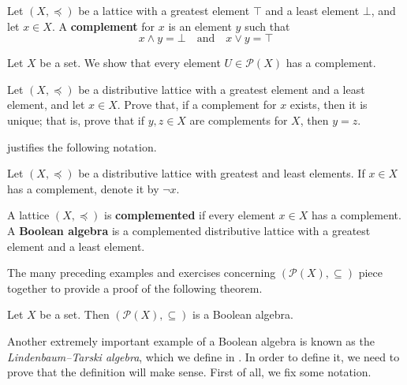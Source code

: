 \begin{definition}
\label{defComplement}
Let $(X, \preceq)$ be a lattice with a greatest element $\top$ and a least element $\bot$, and let $x \in X$. A \textbf{complement} for $x$ is an element $y$ such that
\[ x \wedge y = \bot \quad \text{and} \quad x \vee y = \top \]
\end{definition}

\begin{example}
Let $X$ be a set. We show that every element $U \in \mathcal{P}(X)$ has a complement.
\end{example}

\begin{exercise}
Let $(X, \preceq)$ be a distributive lattice with a greatest element and a least element, and let $x \in X$. Prove that, if a complement for $x$ exists, then it is unique; that is, prove that if $y,z \in X$ are complements for $X$, then $y=z$.
\end{exercise}

 justifies the following notation.

\begin{notation}
\label{ntnComplement}
Let $(X, \preceq)$ be a distributive lattice with greatest and least elements. If $x \in X$ has a complement, denote it by $\neg x$.
\end{notation}

\begin{definition}
\label{defBooleanAlgebra}
A lattice $(X, \preceq)$ is \textbf{complemented} if every element $x \in X$ has a complement. A \textbf{Boolean algebra} is a complemented distributive lattice with a greatest element and a least element.
\end{definition}

The many preceding examples and exercises concerning $(\mathcal{P}(X), \subseteq)$ piece together to provide a proof of the following theorem.

\begin{theorem}
\label{thmPowerSetIsBooleanAlgebra}
Let $X$ be a set. Then $(\mathcal{P}(X), \subseteq)$ is a Boolean algebra.
\end{theorem}

Another extremely important example of a Boolean algebra is known as the \textit{Lindenbaum--Tarski algebra}, which we define in . In order to define it, we need to prove that the definition will make sense. First of all, we fix some notation.

